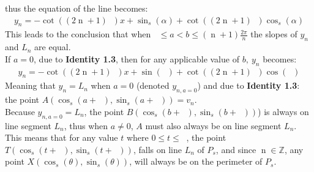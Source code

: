 \documentclass[11pt]{article}
\DeclareMathOperator{\custi}{\mathrm{n}}
\DeclareMathOperator{\period}{\frac{2\pi}{s}}
\DeclareMathOperator{\hp}{\frac{\pi}{s}}
\DeclareMathOperator{\iperiod}{\custi\frac{2\pi}{s}}
\begin{document}
\begin{comment}
(\cos(\iperiod)\tan(\hp))(\sin(a)\cos(b)-\cos(a)\sin(b))+\sin(\iperiod)(\sin(a)\cos(b)-\cos(a)\sin(b))\\
(\cos(\iperiod)\tan(\hp)+\sin(\iperiod)(\sin(a)\cos(b)-\cos(a)\sin(b))\\
(\cos(\iperiod)\tan(\hp)+\sin(\iperiod)\sin(a-b)
\end{gather*}
meaning that we can now simplify the original fraction (denoted \textbf{3.1}) to become:
\begin{gather*}
\frac{(\sin(\iperiod)\tan(\hp)-\cos(\iperiod))\sin(a-b)}{(\cos(\iperiod)\tan(\hp)+\sin(\iperiod))\sin(a-b)}\\
\frac{\sin(\iperiod)\tan(\hp)-\cos(\iperiod)}{\cos(\iperiod)\tan(\hp)+\sin(\iperiod)} * \frac{\cos(\hp)}{\cos(\hp)}\\
\frac{\sin(\iperiod)\sin(\hp)-\cos(\iperiod)\cos(\hp)}{\cos(\iperiod)\sin(\hp)+\sin(\iperiod)\cos(\hp)}\\
\frac{-(\cos(\iperiod)\cos(\hp)-\sin(\iperiod)\sin(\hp))}{\sin(\hp)\cos(\iperiod)+\cos(\hp)\sin(\iperiod)}\\
\frac{-\cos(\iperiod+\hp)}{\sin(\iperiod+\hp)}\\
-\cot(\iperiod+\hp)\\
-\cot((2\custi+1)\hp)
\end{gather*}
\end{comment}
thus the equation of the line becomes:
\begin{gather*}
y_n=-\cot((2\custi+1)\hp)x+\sin_s(\alpha)+\cot((2\custi+1)\hp)\cos_s(\alpha)
\end{gather*}
This leads to the conclusion that when \(\iperiod\leq a<b\leq(\custi+1)\frac{2\pi}{n}\) the slopes of \(y_n\) and \(L_n\) are equal. \\
If \(a=0\), due to \textbf{Identity 1.3}, then for any applicable value of \(b,\ y_n\) becomes:
\begin{gather*}
y_n=-\cot((2\custi+1)\hp)x+\sin(\iperiod)+\cot((2\custi+1)\hp)\cos(\iperiod)
\end{gather*}
Meaning that \(y_n=L_n\) when \(a=0\) (denoted \(y_{n,a=0}\)) and due to \textbf{Identity 1.3}: the point \(A(\cos_s(a+\iperiod), \sin_s(a+\iperiod)) = v_n\).\\
Because \(y_{n,a=0} = L_n\), the point \(B(\cos_s(b+\iperiod),\sin_s(b+\iperiod))\)) is always on line segment \(L_n\), thus when \(a\neq0\), \(A\) must also always be on line segment \(L_n\).\\
This means that for any value \(t\) where \(0\leq t \leq\period\), the point \(T(\cos_s(t+\iperiod),\sin_s(t+\iperiod))\), falls on line \(L_n\) of \(P_s\), and since \(\custi\in\mathbb{Z}\), any point \(X(\cos_s(\theta),\sin_s(\theta))\), will always be on the perimeter of \(P_s\).

\pagebreak

\printbibliography
\end{document}
